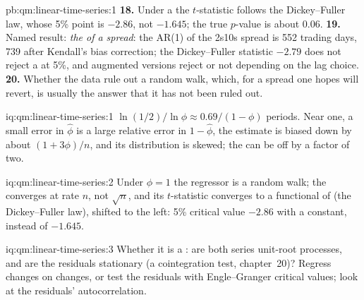 \begin{solution}{pb:qm:linear-time-series:1}
\textbf{18.} Under a  the $t$-statistic follows the Dickey--Fuller law, whose 5\% point is $-2.86$, not $-1.645$; the true $p$-value is about 0.06.
\textbf{19.} Named result: \emph{the  of a spread}: the AR(1)  of the 2s10s spread is 552 trading days, 739 after Kendall's
bias correction; the Dickey--Fuller statistic $-2.79$ does not reject a  at 5\%, and augmented versions reject or not depending on the lag choice.
\textbf{20.} Whether the data rule out a random walk, which, for a spread one hopes will revert, is usually the answer that it has not been ruled out.
\end{solution}

\begin{solution}{iq:qm:linear-time-series:1}
$\ln(1/2)/\ln\phi \approx 0.69/(1 - \phi)$ periods. Near one, a small error in $\hat\phi$ is a large relative error in $1 - \hat\phi$, the estimate is biased down by about
$(1 + 3\phi)/n$, and its distribution is skewed; the  can be off by a factor of two.
\end{solution}

\begin{solution}{iq:qm:linear-time-series:2}
Under $\phi = 1$ the regressor is a random walk; the  converges at rate $n$, not $\sqrt n$, and its $t$-statistic converges to a functional of  (the Dickey--Fuller law), shifted to the left: 5\% critical value $-2.86$ with a constant, instead of $-1.645$.
\end{solution}

\begin{solution}{iq:qm:linear-time-series:3}
Whether it is a : are both series unit-root processes, and are the residuals stationary (a cointegration test, chapter~20)? Regress
changes on changes, or test the residuals with Engle--Granger critical values; look at the residuals' autocorrelation.
\end{solution}

